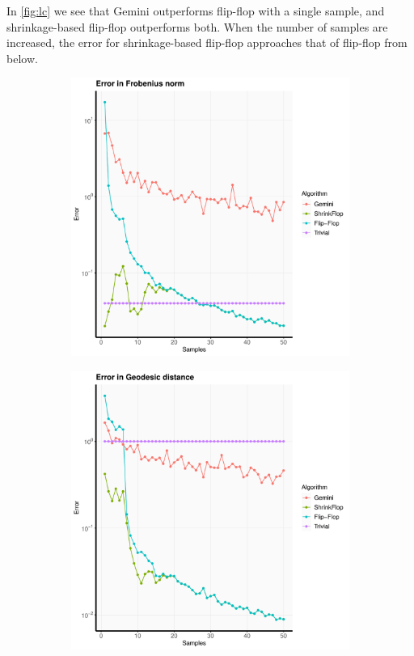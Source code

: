 \documentclass[aos]{imsart}
\theoremstyle{definition}
\numberwithin{equation}{section}
\begin{document}
In \cref{fig:lc} we see that Gemini outperforms flip-flop with a single sample, and shrinkage-based flip-flop outperforms both. When the number of samples are increased, the error for shrinkage-based flip-flop approaches that of flip-flop from below. 


\begin{figure}
         \centering
                       \begin{subfigure}[b]{.4\textwidth}
         \includegraphics[width=\textwidth]{./code/zhou-comparison/25-25-spiked-lc-frob.pdf}
         \end{subfigure}
         \begin{subfigure}[b]{.4\textwidth}
         \includegraphics[width=\textwidth]{./code/zhou-comparison/25-25-spiked-lc-geo.pdf}

\end{subfigure}
\end{figure}
\end{document}
